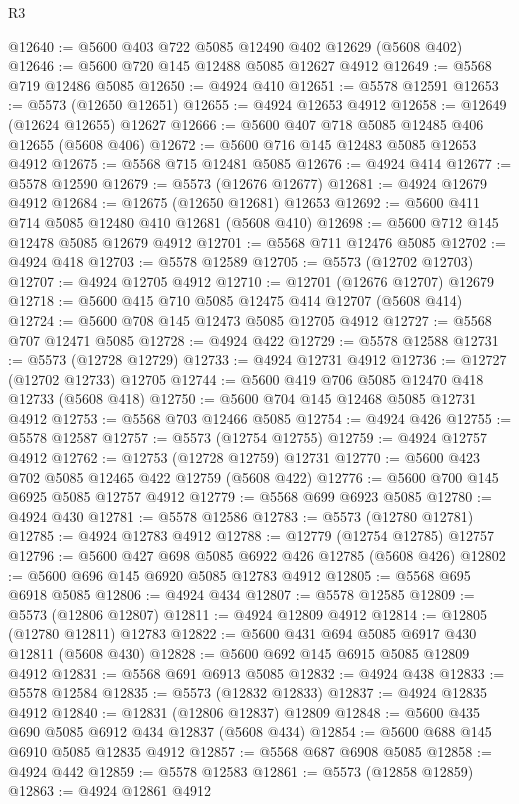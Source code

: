 \begin{lexlean}{R3}
\begin{coremodule}
@12640 := @5600 @403 @722 @5085 @12490 @402 @12629 (@5608 @402)
@12646 := @5600 @720 @145 @12488 @5085 @12627 @4912
@12649 := @5568 @719 @12486 @5085
@12650 := @4924 @410
@12651 := @5578 @12591
@12653 := @5573 (@12650 @12651)
@12655 := @4924 @12653 @4912
@12658 := @12649 (@12624 @12655) @12627
@12666 := @5600 @407 @718 @5085 @12485 @406 @12655 (@5608 @406)
@12672 := @5600 @716 @145 @12483 @5085 @12653 @4912
@12675 := @5568 @715 @12481 @5085
@12676 := @4924 @414
@12677 := @5578 @12590
@12679 := @5573 (@12676 @12677)
@12681 := @4924 @12679 @4912
@12684 := @12675 (@12650 @12681) @12653
@12692 := @5600 @411 @714 @5085 @12480 @410 @12681 (@5608 @410)
@12698 := @5600 @712 @145 @12478 @5085 @12679 @4912
@12701 := @5568 @711 @12476 @5085
@12702 := @4924 @418
@12703 := @5578 @12589
@12705 := @5573 (@12702 @12703)
@12707 := @4924 @12705 @4912
@12710 := @12701 (@12676 @12707) @12679
@12718 := @5600 @415 @710 @5085 @12475 @414 @12707 (@5608 @414)
@12724 := @5600 @708 @145 @12473 @5085 @12705 @4912
@12727 := @5568 @707 @12471 @5085
@12728 := @4924 @422
@12729 := @5578 @12588
@12731 := @5573 (@12728 @12729)
@12733 := @4924 @12731 @4912
@12736 := @12727 (@12702 @12733) @12705
@12744 := @5600 @419 @706 @5085 @12470 @418 @12733 (@5608 @418)
@12750 := @5600 @704 @145 @12468 @5085 @12731 @4912
@12753 := @5568 @703 @12466 @5085
@12754 := @4924 @426
@12755 := @5578 @12587
@12757 := @5573 (@12754 @12755)
@12759 := @4924 @12757 @4912
@12762 := @12753 (@12728 @12759) @12731
@12770 := @5600 @423 @702 @5085 @12465 @422 @12759 (@5608 @422)
@12776 := @5600 @700 @145 @6925 @5085 @12757 @4912
@12779 := @5568 @699 @6923 @5085
@12780 := @4924 @430
@12781 := @5578 @12586
@12783 := @5573 (@12780 @12781)
@12785 := @4924 @12783 @4912
@12788 := @12779 (@12754 @12785) @12757
@12796 := @5600 @427 @698 @5085 @6922 @426 @12785 (@5608 @426)
@12802 := @5600 @696 @145 @6920 @5085 @12783 @4912
@12805 := @5568 @695 @6918 @5085
@12806 := @4924 @434
@12807 := @5578 @12585
@12809 := @5573 (@12806 @12807)
@12811 := @4924 @12809 @4912
@12814 := @12805 (@12780 @12811) @12783
@12822 := @5600 @431 @694 @5085 @6917 @430 @12811 (@5608 @430)
@12828 := @5600 @692 @145 @6915 @5085 @12809 @4912
@12831 := @5568 @691 @6913 @5085
@12832 := @4924 @438
@12833 := @5578 @12584
@12835 := @5573 (@12832 @12833)
@12837 := @4924 @12835 @4912
@12840 := @12831 (@12806 @12837) @12809
@12848 := @5600 @435 @690 @5085 @6912 @434 @12837 (@5608 @434)
@12854 := @5600 @688 @145 @6910 @5085 @12835 @4912
@12857 := @5568 @687 @6908 @5085
@12858 := @4924 @442
@12859 := @5578 @12583
@12861 := @5573 (@12858 @12859)
@12863 := @4924 @12861 @4912

\end{coremodule}
\end{lexlean}

